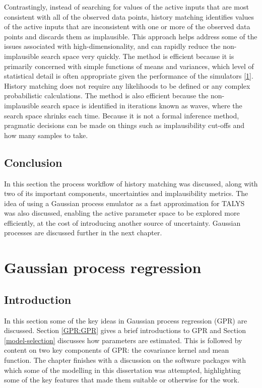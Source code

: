 \documentclass[
  12pt,
  a4paper,
  twoside]{book}
\begin{document}
Contrastingly, instead of searching for values of the active inputs that are most consistent with all of the observed data points, history matching identifies values of the active inputs that are inconsistent with one or more of the observed data points and discards them as implausible. This approach helps address some of the issues associated with high-dimensionality, and can rapidly reduce the non-implausible search space very quickly. The method is efficient because it is primarily concerned with simple functions of means and variances, which level of statistical detail is often appropriate given the performance of the simulators \protect\hyperlink{ref-jeremy_histmatch}{{[}1{]}}. History matching does not require any likelihoods to be defined or any complex probabilistic calculations. The method is also efficient because the non-implausible search space is identified in iterations known as waves, where the search space shrinks each time. Because it is not a formal inference method, pragmatic decisions can be made on things such as implausibility cut-offs and how many samples to take.

\hypertarget{conclusion-1}{%
\section{Conclusion}\label{conclusion-1}}

In this section the process workflow of history matching was discussed, along with two of its important components, uncertainties and implausibility metrics. The idea of using a Gaussian process emulator as a fast approximation for TALYS was also discussed, enabling the active parameter space to be explored more efficiently, at the cost of introducing another source of uncertainty. Gaussian processes are discussed further in the next chapter.

\hypertarget{GPR}{%
\chapter{Gaussian process regression}\label{GPR}}

\hypertarget{introduction-2}{%
\section{Introduction}\label{introduction-2}}

In this section some of the key ideas in Gaussian process regression (GPR) are discussed. Section \ref{GPR:GPR} gives a brief introductions to GPR and Section \ref{model-selection} discusses how parameters are estimated. This is followed by content on two key components of GPR: the covariance kernel and mean function. The chapter finishes with a discussion on the software packages with which some of the modelling in this dissertation was attempted, highlighting some of the key features that made them suitable or otherwise for the work.
\end{document}
